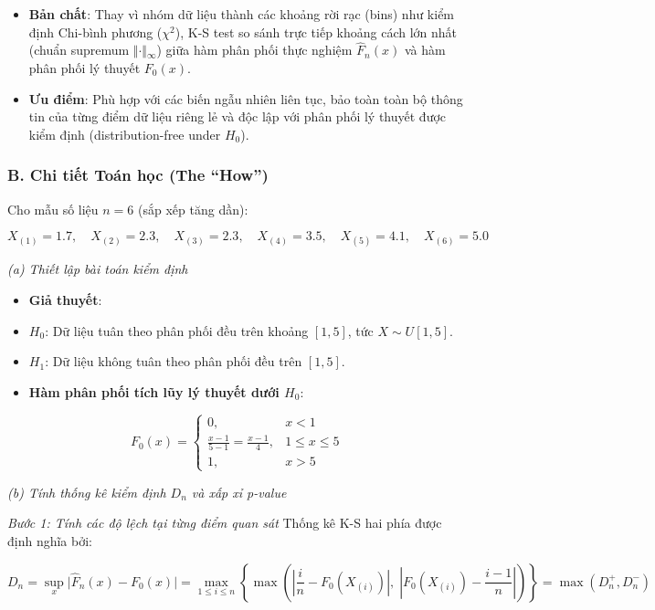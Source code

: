 \documentclass[12pt,a4paper]{article}
\begin{document}
\begin{itemize}

\item
  \textbf{Bản chất}: Thay vì nhóm dữ liệu thành các khoảng rời rạc (bins) như kiểm định Chi-bình phương (\(\chi^2\)), K-S test so sánh trực tiếp khoảng cách lớn nhất (chuẩn supremum \(\Vert{}\cdot\Vert{}_\infty\)) giữa hàm phân phối thực nghiệm \(\widehat{F}_n(x)\) và hàm phân phối lý thuyết \(F_0(x)\).
\item
  \textbf{Ưu điểm}: Phù hợp với các biến ngẫu nhiên liên tục, bảo toàn toàn bộ thông tin của từng điểm dữ liệu riêng lẻ và độc lập với phân phối lý thuyết được kiểm định (distribution-free under \(H_0\)).
\end{itemize}

\subsubsection{B. Chi tiết Toán học (The ``How'')}\label{b.-chi-tiux1ebft-touxe1n-hux1ecdc-the-how-6}

Cho mẫu số liệu \(n = 6\) (sắp xếp tăng dần):

\[X_{(1)} = 1.7, \quad X_{(2)} = 2.3, \quad X_{(3)} = 2.3, \quad X_{(4)} = 3.5, \quad X_{(5)} = 4.1, \quad X_{(6)} = 5.0\]

\emph{(a) Thiết lập bài toán kiểm định}

\begin{itemize}
\item
  \textbf{Giả thuyết}:
\item
  \(H_0\): Dữ liệu tuân theo phân phối đều trên khoảng \([1, 5]\), tức \(X \sim U[1, 5]\).
\item
  \(H_1\): Dữ liệu không tuân theo phân phối đều trên \([1, 5]\).
\item
  \textbf{Hàm phân phối tích lũy lý thuyết dưới \(H_0\)}:
\end{itemize}

\[F_0(x) = \begin{cases}    0, & x < 1 \\    \frac{x - 1}{5 - 1} = \frac{x - 1}{4}, & 1 \le x \le 5 \\    1, & x > 5    \end{cases}\]

\emph{(b) Tính thống kê kiểm định \(D_n\) và xấp xỉ p-value}

\emph{Bước 1: Tính các độ lệch tại từng điểm quan sát}
Thống kê K-S hai phía được định nghĩa bởi:

\[D_n = \sup_{x} \vert{}\widehat{F}_n(x) - F_0(x)\vert{} = \max_{1 \le i \le n} \left\{ \max\left( \left\vert{}\frac{i}{n} - F_0(X_{(i)})\right\vert{}, \; \left\vert{}F_0(X_{(i)}) - \frac{i-1}{n}\right\vert{} \right) \right\} = \max(D_n^+, D_n^-)\]
\end{document}

